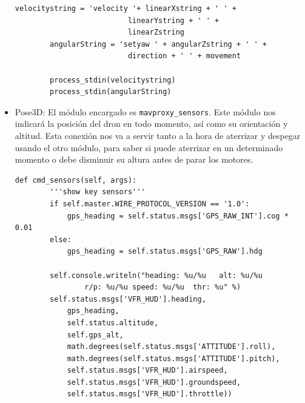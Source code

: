 \begin{itemize}
\begin{lstlisting}[frame=single]
        velocitystring = 'velocity '+ linearXstring + ' ' + 
        				  linearYstring + ' ' + 
                          linearZstring
        angularString = 'setyaw ' + angularZstring + ' ' + 
        				  direction + ' ' + movement

        process_stdin(velocitystring) 
        process_stdin(angularString)
\end{lstlisting}


\item Pose3D: El módulo encargado es \texttt{mavproxy\_sensors}. Este módulo nos indicará la posición del dron en todo momento, así como su orientación y altitud. Esta conexión nos va a servir tanto a la hora de aterrizar y despegar usando el otro módulo, para saber si puede aterrizar en un determinado momento o debe disminuir su altura antes de parar los motores.

\begin{lstlisting}[frame=single]
    def cmd_sensors(self, args):
        '''show key sensors'''
        if self.master.WIRE_PROTOCOL_VERSION == '1.0':
            gps_heading = self.status.msgs['GPS_RAW_INT'].cog * 0.01
        else:
            gps_heading = self.status.msgs['GPS_RAW'].hdg

        self.console.writeln("heading: %u/%u   alt: %u/%u  
        		r/p: %u/%u speed: %u/%u  thr: %u" %)
        self.status.msgs['VFR_HUD'].heading,
            gps_heading,
            self.status.altitude,
            self.gps_alt,
            math.degrees(self.status.msgs['ATTITUDE'].roll),
            math.degrees(self.status.msgs['ATTITUDE'].pitch),
            self.status.msgs['VFR_HUD'].airspeed,
            self.status.msgs['VFR_HUD'].groundspeed,
			self.status.msgs['VFR_HUD'].throttle))
\end{lstlisting}
\end{itemize}